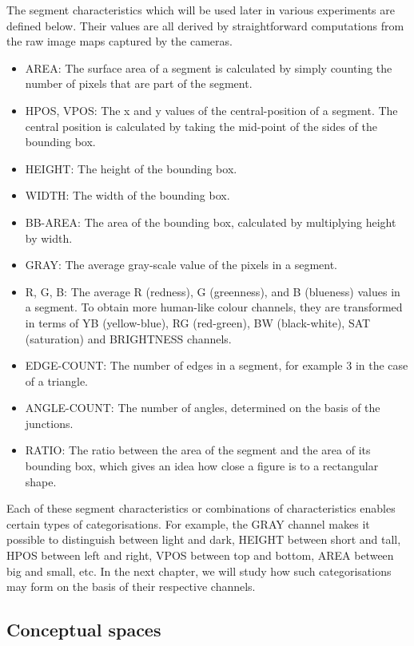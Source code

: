 The segment characteristics which will be 
used later in various experiments are defined below. 
Their values are all derived by straightforward computations from 
the raw image maps captured by the cameras. 
\begin{itemize} 
\item AREA: The surface area of a segment
is calculated by simply counting the number of pixels that are part 
of the segment. 
\item HPOS, VPOS: The x and y values of the 
central-position of a segment. The central position 
is calculated by taking the mid-point of the sides 
of the bounding box. 
\item HEIGHT: The height of the bounding box. 
\item WIDTH: The width of the bounding box. 
\item BB-AREA: The area of the bounding box,
calculated by multiplying height by width. 
\item GRAY: The average gray-scale value of the pixels
in a segment. 
\item R, G, B: The average R (redness), G
(greenness), and B (blueness) values in a
segment. To obtain more human-like colour channels, they are
transformed in terms of YB (yellow-blue), RG (red-green), 
BW (black-white), SAT (saturation) and BRIGHTNESS channels. 
\item EDGE-COUNT: The number of edges in
a segment, for example 3 in the case of 
a triangle. 
\item ANGLE-COUNT: The number of angles, determined on the 
basis of the junctions. 
\item RATIO: The ratio between the area of the segment 
and the area of its bounding box, which gives an idea how close 
a figure is to a rectangular shape. 
\end{itemize}

Each of these segment characteristics or combinations of
characteristics enables certain types of
categorisations. For example, the GRAY channel makes 
it possible to distinguish between 
light and dark, HEIGHT between short and tall, HPOS between 
left and right, VPOS between top and bottom, 
AREA between big and small, etc. In the next chapter, we will study 
how such categorisations may 
form on the basis of their respective channels. 

\subsection{Conceptual spaces}

